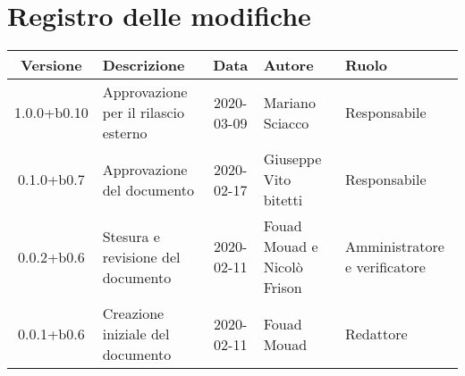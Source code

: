 \section*{Registro delle modifiche}

\begin{center}
	\begin{longtable}{|c|p{3.5cm}|c|p{3cm}|p{3cm}|}
	\hline
	\rowcolor{lighter-grayer}
	\textbf{Versione} & \textbf{Descrizione} & \textbf{Data} & \textbf{Autore} & \textbf{Ruolo} \\
	\hline
	\endfirsthead


	1.0.0+b0.10 & Approvazione per il rilascio esterno & 2020-03-09 & Mariano Sciacco & Responsabile \\
	\hline
	0.1.0+b0.7 & Approvazione del documento & 2020-02-17 & Giuseppe Vito bitetti & Responsabile \\
	\hline
	0.0.2+b0.6 & Stesura e revisione del documento & 2020-02-11 & Fouad Mouad e Nicolò Frison & Amministratore e verificatore \\
	\hline
	0.0.1+b0.6 & Creazione iniziale del documento & 2020-02-11 & Fouad Mouad & Redattore \\
	\hline

	\end{longtable}
\end{center}